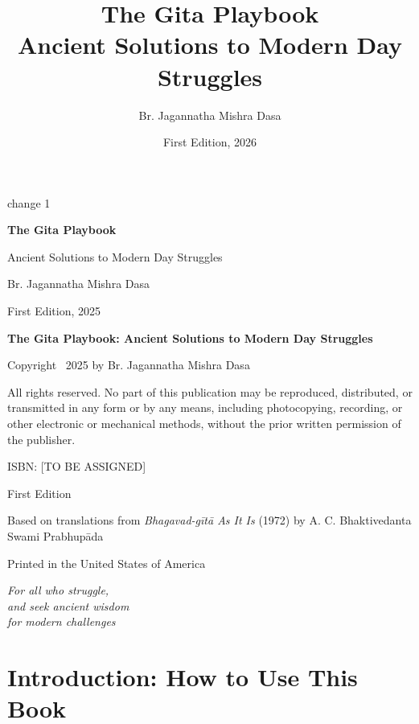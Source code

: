 \documentclass[11pt,twoside]{book}
\author{Br. Jagannatha Mishra Dasa}
\date{First Edition, 2026}
\title{The Gita Playbook\\\medskip
\large Ancient Solutions to Modern Day Struggles}
\begin{document}
\tableofcontents

change 1

\begin{titlepage}
\centering
\vspace*{2cm}

{\Huge\bfseries The Gita Playbook}

\vspace{0.5cm}

{\Large Ancient Solutions to Modern Day Struggles}

\vspace{2cm}

{\Large Br. Jagannatha Mishra Dasa}

\vfill

{\large First Edition, 2025}

\end{titlepage}

\thispagestyle{empty}
\null\vfill
\begin{flushleft}
\textbf{The Gita Playbook: Ancient Solutions to Modern Day Struggles}

Copyright \textcopyright\ 2025 by Br. Jagannatha Mishra Dasa

All rights reserved. No part of this publication may be reproduced, distributed, or transmitted in any form or by any means, including photocopying, recording, or other electronic or mechanical methods, without the prior written permission of the publisher.

ISBN: [TO BE ASSIGNED]

First Edition

Based on translations from \textit{Bhagavad-gītā As It Is} (1972) by A. C. Bhaktivedanta Swami Prabhupāda

Printed in the United States of America
\end{flushleft}
\newpage

\thispagestyle{empty}
\null\vfill
\begin{center}
\textit{For all who struggle,\\
and seek ancient wisdom\\
for modern challenges}
\end{center}
\vfill
\newpage

\setcounter{page}{1}
\chapter*{Introduction: How to Use This Book}
\pagestyle{frontmatter}
\end{document}
